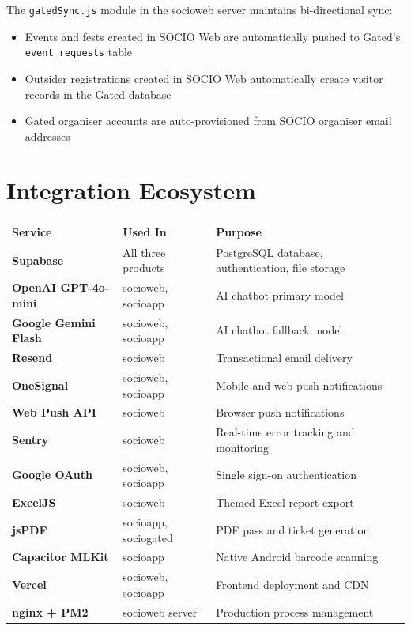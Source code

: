 \documentclass[12pt,a4paper]{article}
\begin{document}
The \texttt{gatedSync.js} module in the socioweb server maintains bi-directional sync:

\begin{itemize}[leftmargin=*]
    \item Events and fests created in SOCIO Web are automatically pushed to Gated's \texttt{event\_requests} table
    \item Outsider registrations created in SOCIO Web automatically create visitor records in the Gated database
    \item Gated organiser accounts are auto-provisioned from SOCIO organiser email addresses
\end{itemize}

\newpage
\section{Integration Ecosystem}

\begin{tabularx}{\textwidth}{L{3.5cm} L{3cm} X}
\toprule
{}
\textbf{Service} & \textbf{Used In} & \textbf{Purpose} \\
\midrule
\textbf{Supabase} & All three products & PostgreSQL database, authentication, file storage \\
\textbf{OpenAI GPT-4o-mini} & socioweb, socioapp & AI chatbot primary model \\
\textbf{Google Gemini Flash} & socioweb, socioapp & AI chatbot fallback model \\
\textbf{Resend} & socioweb & Transactional email delivery \\
\textbf{OneSignal} & socioweb, socioapp & Mobile and web push notifications \\
\textbf{Web Push API} & socioweb & Browser push notifications \\
\textbf{Sentry} & socioweb & Real-time error tracking and monitoring \\
\textbf{Google OAuth} & socioweb, socioapp & Single sign-on authentication \\
\textbf{ExcelJS} & socioweb & Themed Excel report export \\
\textbf{jsPDF} & socioapp, sociogated & PDF pass and ticket generation \\
\textbf{Capacitor MLKit} & socioapp & Native Android barcode scanning \\
\textbf{Vercel} & socioweb, socioapp & Frontend deployment and CDN \\
\textbf{nginx + PM2} & socioweb server & Production process management \\
\bottomrule
\end{tabularx}
\end{document}
